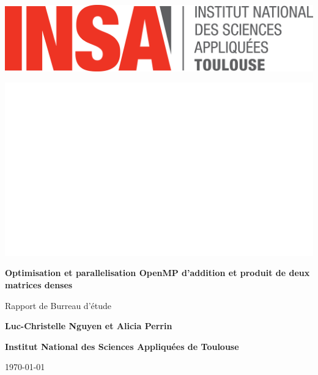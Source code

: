 \documentclass{report}
\begin{document}
\begin{titlepage}
    \centering

    \noindent %
    \begin{minipage}{0.5\textwidth}
        \includegraphics[width=0.5\linewidth]{images/logo_INSA.png} %
    \end{minipage}%
    \hfill %
    \begin{minipage}{0.5\textwidth}
        \flushright %
        \includegraphics[width=0.5\linewidth]{images/blanc.jpg} %
    \end{minipage}


    \vspace*{2cm} %
    {\Huge\bfseries Optimisation et parallelisation OpenMP d'addition et produit
de deux matrices denses \par}
    \vspace{1cm}
    {\huge Rapport de Burreau d'étude\par}
    \vspace{2cm}
    {\Large \textbf{Luc-Christelle Nguyen et Alicia Perrin} \par}
    \vspace{2cm}
    
    {\Large \textbf{Institut National des Sciences Appliquées de Toulouse} \par}
    \vspace{1cm}
    {\large \today \par}
\end{titlepage}
\end{document}
